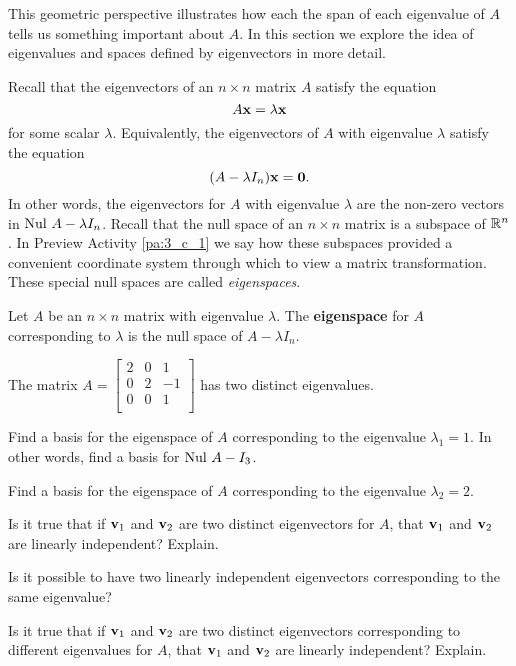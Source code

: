 This geometric perspective illustrates how each the span of each eigenvalue of $A$ tells us something important about $A$.  In this section we explore the idea of eigenvalues and spaces defined by eigenvectors in more detail.

\label{sec:mtx_egspace}

Recall that the eigenvectors of an $n \times n$ matrix $A$ satisfy the equation 
\[A \mathbf{x} = \lambda \mathbf{x}\]
for some scalar $\lambda$. Equivalently, the eigenvectors of $A$ with eigenvalue $\lambda$ satisfy the equation 
\[(A - \lambda I_n) \mathbf{x} = \mathbf{0}.\]
In other words, the eigenvectors for $A$ with eigenvalue $\lambda$ are the non-zero vectors in $\text{Nul } A-\lambda I_n$. Recall that the null space of an $n \times n$ matrix is a subspace of $\mathbb{R}^n$. In Preview Activity \ref{pa:3_c_1} we say how these subspaces provided a convenient coordinate system through which to view a matrix transformation. These special null spaces are called \emph{eigenspaces}.



\begin{definition} Let $A$ be an $n \times n$ matrix with eigenvalue $\lambda$. The \textbf{eigenspace} for $A$ corresponding to $\lambda$ is the null space of $A - \lambda I_n$.
\end{definition}



\begin{activity} \label{act:3_c_1} The matrix $A = \left[ \begin{array}{rrrr} 2&0&1 \\ 0&2&-1 \\ 0&0&1 \\  \end{array} \right]$ has two distinct eigenvalues. 
	\ba
	\item Find a basis for the eigenspace of $A$ corresponding to the eigenvalue $\lambda_1 = 1$. In other words, find a basis for $\text{Nul } A - I_3$. 



	\item Find a basis for the eigenspace of $A$ corresponding to the eigenvalue $\lambda_2 = 2$. 



	\item Is it true that if $\mathbf{v}_1$ and $\mathbf{v}_2$ are two distinct eigenvectors for $A$, that $\mathbf{v}_1$ and $\mathbf{v}_2$ are linearly independent? Explain. 



	\item Is it possible to have two linearly independent eigenvectors corresponding to the same eigenvalue?
	
	
	

	\item Is it true that if $\mathbf{v}_1$ and $\mathbf{v}_2$ are two distinct eigenvectors corresponding to different eigenvalues for $A$, that $\mathbf{v}_1$ and $\mathbf{v}_2$ are linearly independent? Explain. 
	
	
	
	\ea
	
\end{activity}



